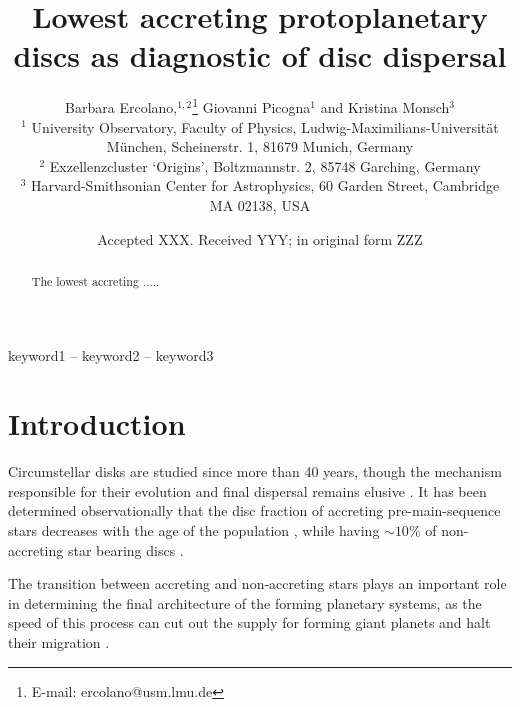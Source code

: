 \documentclass[fleqn,usenatbib,letters]{mnras}
\title[Low accretors and disc dispersal]{Lowest accreting protoplanetary discs as diagnostic of disc dispersal}
\author[B. Ercolano et al.]{
Barbara Ercolano,$^{1,2}$\thanks{E-mail: ercolano@usm.lmu.de}
Giovanni Picogna$^{1}$
and Kristina Monsch$^{3}$
\\
$^{1}$ University Observatory, Faculty of Physics, Ludwig-Maximilians-Universit\"at M\"unchen, Scheinerstr. 1, 81679 Munich, Germany\\
$^{2}$ Exzellenzcluster `Origins', Boltzmannstr. 2, 85748 Garching, Germany\\
$^{3}$ Harvard-Smithsonian Center for Astrophysics, 60 Garden Street, Cambridge MA 02138, USA
}
\date{Accepted XXX. Received YYY; in original form ZZZ}
\begin{document}
\label{firstpage}
\pagerange{\pageref{firstpage}--\pageref{lastpage}}
\maketitle

\begin{abstract}

The lowest accreting ..... 
\end{abstract}

\begin{keywords}
keyword1 -- keyword2 -- keyword3
\end{keywords}



\section{Introduction}

Circumstellar disks are studied since more than 40 years, though the mechanism responsible for their evolution and final dispersal remains elusive \citep[see for recent reviews][]{Pascucci2022,Lesur2022}. It has been determined observationally that the disc fraction of accreting pre-main-sequence stars decreases with the age of the population \citep[see e.g.][]{Mamajek2009}, while having $\sim10\%$ of non-accreting star bearing discs \citep{Skrutskie1990}.

The transition between accreting and non-accreting stars plays an important role in determining the final architecture of the forming planetary systems, as the speed of this process can cut out the supply for forming giant planets and halt their migration \citep[see e.g.][]{Monsch2019}.
\end{document}
